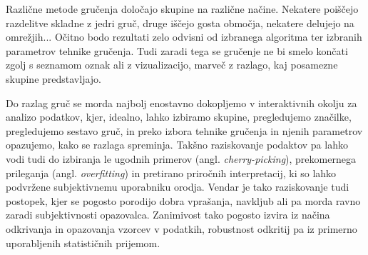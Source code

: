 Različne metode gručenja določajo skupine na različne načine. Nekatere poiščejo razdelitve skladne z jedri gruč, druge iščejo gosta območja, nekatere delujejo na omrežjih... Očitno bodo rezultati zelo odvisni od izbranega algoritma ter izbranih parametrov tehnike gručenja. Tudi zaradi tega se gručenje ne bi smelo končati zgolj s seznamom oznak ali z vizualizacijo, marveč z razlago, kaj posamezne skupine predstavljajo.

Do razlag gruč se morda najbolj enostavno dokopljemo v interaktivnih okolju za analizo podatkov, kjer, idealno, lahko izbiramo skupine, pregledujemo značilke, pregledujemo sestavo gruč, in preko izbora tehnike gručenja in njenih parametrov opazujemo, kako se razlaga spreminja. Takšno raziskovanje podaktov pa lahko vodi tudi do izbiranja le ugodnih primerov (angl. {\em cherry-picking}), prekomernega prileganja (angl. {\em overfitting}) in pretirano priročnih interpretacij, ki so lahko podvržene subjektivnemu uporabniku orodja. Vendar je tako raziskovanje tudi postopek, kjer se pogosto porodijo dobra vprašanja, navkljub ali pa morda ravno zaradi subjektivnosti opazovalca. Zanimivost tako pogosto izvira iz načina odkrivanja in opazovanja vzorcev v podatkih, robustnost odkritij pa iz primerno uporabljenih statističnih prijemom.